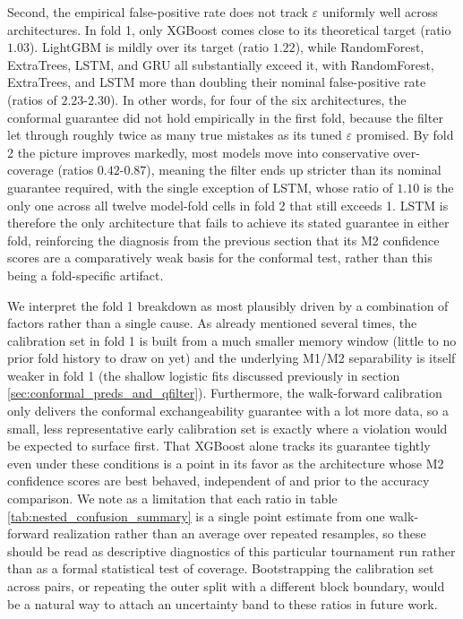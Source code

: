 \documentclass[12pt, a4paper]{article}
\begin{document}
\medskip

Second, the empirical false-positive rate does not track $\varepsilon$ uniformly well across architectures. In fold 1, only XGBoost 
comes close to its theoretical target (ratio $1.03$). LightGBM is mildly over its target (ratio $1.22$), while RandomForest, ExtraTrees, LSTM, and GRU all substantially exceed 
it, with RandomForest, ExtraTrees, and LSTM more than doubling their nominal false-positive rate (ratios of $2.23$-$2.30$). In other words, for four of the six architectures, the 
conformal guarantee did not hold empirically in the first fold, because the filter let through roughly twice as many true mistakes as its tuned $\varepsilon$ promised. By fold 2 the 
picture improves markedly, most models move into conservative over-coverage (ratios $0.42$-$0.87$), meaning the filter ends up stricter than its nominal guarantee 
required, with the single exception of LSTM, whose ratio of $1.10$ is the only one across all twelve model-fold cells in fold 2 that still exceeds 1. LSTM is therefore the only 
architecture that fails to achieve its stated guarantee in either fold, reinforcing the diagnosis from the previous section that its M2 confidence scores are a 
comparatively weak basis for the conformal test, rather than this being a fold-specific artifact.

\medskip

We interpret the fold 1 breakdown as most plausibly driven by a combination of factors rather than a single cause. As already mentioned several times, the calibration set in fold 1 
is built from a much smaller memory window (little to no prior fold history to draw on yet) and the underlying M1/M2 separability is itself weaker in fold 1 
(the shallow logistic fits discussed previously in section \ref{sec:conformal_preds_and_qfilter}). Furthermore, the walk-forward calibration only delivers the conformal exchangeability 
guarantee with a lot more data, so a small, less representative early calibration set is exactly where a violation would be expected to surface first. 
That XGBoost alone tracks its guarantee tightly even under these conditions is a point in its favor as the architecture whose M2 confidence 
scores are best behaved, independent of and prior to the accuracy comparison. We note as a limitation that each ratio in table \ref{tab:nested_confusion_summary} is a single 
point estimate from one walk-forward realization rather than an average over repeated resamples, so these should be read as descriptive diagnostics of this particular tournament run 
rather than as a formal statistical test of coverage. Bootstrapping the calibration set across pairs, or repeating the outer split with a different block boundary, 
would be a natural way to attach an uncertainty band to these ratios in future work.
\end{document}

